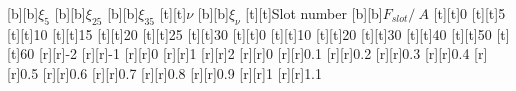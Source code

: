 %    
%
%
\begin{psfrags}%
\psfragscanon%
%
[b][b]{{\tiny $\xi_{5}$}}%
[b][b]{{\tiny $\xi_{25}$}}%
[b][b]{{\tiny $\xi_{35}$}}%
[t][t]{{\tiny $\nu$}}%
[b][b]{{\tiny $\xi_{\nu}$}}%
[t][t]{{\tiny Slot number}}%
[b][b]{{\tiny $F_{slot}/\SI{}{A}$}}%
%
[t][t]{{\tiny 0}}%
[t][t]{{\tiny 5}}%
[t][t]{{\tiny 10}}%
[t][t]{{\tiny 15}}%
[t][t]{{\tiny 20}}%
[t][t]{{\tiny 25}}%
[t][t]{{\tiny 30}}%
[t][t]{{\tiny 0}}%
[t][t]{{\tiny 10}}%
[t][t]{{\tiny 20}}%
[t][t]{{\tiny 30}}%
[t][t]{{\tiny 40}}%
[t][t]{{\tiny 50}}%
[t][t]{{\tiny 60}}%
%
[r][r]{{\tiny -2}}%
[r][r]{{\tiny -1}}%
[r][r]{{\tiny 0}}%
[r][r]{{\tiny 1}}%
[r][r]{{\tiny 2}}%
[r][r]{{\tiny 0}}%
[r][r]{{\tiny 0.1}}%
[r][r]{{\tiny 0.2}}%
[r][r]{{\tiny 0.3}}%
[r][r]{{\tiny 0.4}}%
[r][r]{{\tiny 0.5}}%
[r][r]{{\tiny 0.6}}%
[r][r]{{\tiny 0.7}}%
[r][r]{{\tiny 0.8}}%
[r][r]{{\tiny 0.9}}%
[r][r]{{\tiny 1}}%
[r][r]{{\tiny 1.1}}%
%

%
\end{psfrags}%
%
